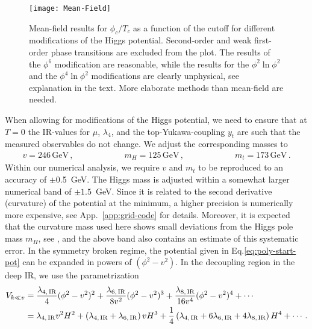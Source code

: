\documentclass[aps,prd,11pt,tightenlines,superscriptaddress,nofootinbib,preprintnumbers,notitlepage]{revtex4-1}
\newcommand{\qqqquad}{\qquad \qquad \qquad}
\newcommand{\gev}{\text{GeV}}
\begin{document}
\begin{figure}[t]
 \centering
 \texttt{[image: Mean-Field]}
 \caption{Mean-field results for $\phi_c/T_c$ as a function of the cutoff
   for different modifications of the Higgs potential. Second-order and 
   weak first-order phase transitions are excluded from the plot.
   The results of the
   $\phi^6$ modification are reasonable, while the results for the 
   $\phi^2\ln\phi^2$ and the $\phi^4\ln\phi^2$ modifications are clearly
   unphysical, see explanation in the text. More elaborate methods than mean-field are needed.
   }
 \label{fig:mean-field}
\end{figure}


When allowing for modifications of the Higgs potential, we need to
ensure that at $T=0$ the IR-values for $\mu$, $\lambda_4$,
and the top-Yukawa-coupling $y_t$ are such that the 
measured observables do not change. We adjust the corresponding masses to
%
\begin{align}
 v = 246 \,\gev\,, \qqqquad 
 m_H = 125 \,\gev\,, \qqqquad 
 m_t = 173 \,\gev \,.
\label{eq:ir_data}
\end{align}
%
Within our numerical analysis, we require $v$ and $m_t$ to be
reproduced to an accuracy of $\pm$0.5~GeV. The Higgs mass is adjusted
within a somewhat larger numerical band of $\pm 1.5$~GeV. Since it is
related to the second derivative (curvature) of the
potential at the minimum, a higher precision is numerically more
expensive, see App.~\ref{app:grid-code} for details.
Moreover, it is expected that the curvature mass used here shows
small deviations from the Higgs pole mass $m_H$, see
\cite{Helmboldt:2014iya}, and the above band also contains an
estimate of this systematic error.  In the symmetry broken regime,
the potential given in Eq.\eqref{eq:poly-start-pot} can be expanded in
powers of $(\phi^2 - v^2)$.  In the decoupling region in the deep IR,
we use the parametrization
\begin{align}
  V_{k\ll v} &= \frac{\lambda_{4,\,\rm IR}}{4} (\phi^2 - v^2)^2 
               +  \frac{\lambda_{6,\,\rm IR}}{8 v^2} (\phi^2 - v^2)^3
               +  \frac{\lambda_{8,\,\rm IR}}{16v^4} (\phi^2 - v^2)^4 + \cdots\notag \\
             &=  \lambda_{4,\,\rm IR} v^2 H^2 
               + \left( \lambda_{4,\,\rm IR} + \lambda_{6,\,\rm IR} \right) v H^3 
               + \frac{1}{4} \left( \lambda_{4,\,\rm IR}  + 6 \lambda_{6,\,\rm IR}  +
 4 \lambda_{8,\,\rm IR}   \right) H^4 
               + \cdots\,.
\end{align}
\end{document}

